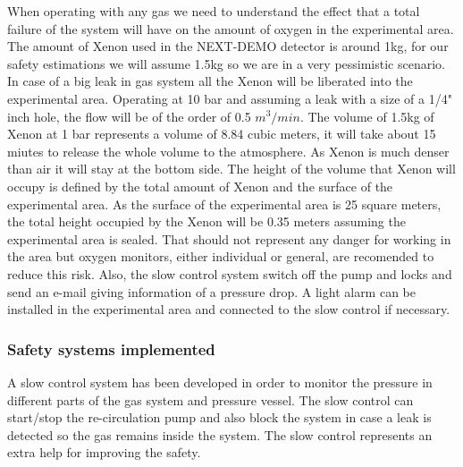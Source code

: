 When operating with any gas we need to understand the effect that a total failure of the system will have on the amount of oxygen in the experimental area. The amount of Xenon used in the NEXT-DEMO detector is around 1kg, for our safety estimations we will assume 1.5kg so we are in a very pessimistic scenario.
In case of a big leak in gas system all the Xenon will be liberated into the experimental area. Operating at 10 bar and assuming a leak with a size of a 1/4" inch hole, the flow will be of the order of 0.5 $m^3/min$. The volume of 1.5kg of Xenon at 1 bar represents a volume of 8.84 cubic meters, it will take about 15 miutes to release the whole volume to the atmosphere. As Xenon is much denser than air it will stay at the bottom side. The height of the volume that Xenon will occupy is defined by the total amount of Xenon and the surface of the experimental area. As the surface of the experimental area is 25 square meters, the total height occupied by the Xenon will be 0.35 meters assuming the experimental area is sealed. That should not represent any danger for working in the area but oxygen monitors, either individual or general, are recomended to reduce this risk. Also, the slow control system switch off the pump and locks and send an e-mail giving information of a pressure drop. A light alarm can be installed in the experimental area and connected to the slow control if necessary.


%
%




\subsubsection{Safety systems implemented}
A slow control system has been developed in order to monitor the pressure in different parts of the gas system and pressure vessel. The slow control can start/stop the re-circulation pump and also block the system in case a leak is detected so the gas remains inside the system. The slow control represents an extra help for improving the safety.


